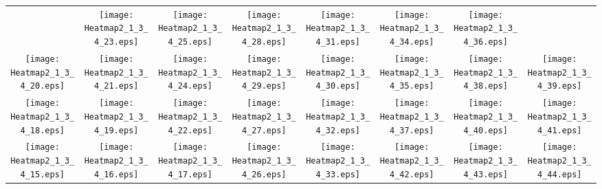 \documentclass{standalone}
\begin{document}
\renewcommand{\arraystretch}{0}
\setlength{\tabcolsep}{0pt}
\begin{tabular}{ *8{c} }
 & \texttt{[image: Heatmap2\_1\_3\_4\_23.eps]} & \texttt{[image: Heatmap2\_1\_3\_4\_25.eps]} & \texttt{[image: Heatmap2\_1\_3\_4\_28.eps]} & \texttt{[image: Heatmap2\_1\_3\_4\_31.eps]} & \texttt{[image: Heatmap2\_1\_3\_4\_34.eps]} & \texttt{[image: Heatmap2\_1\_3\_4\_36.eps]} &  \\
\texttt{[image: Heatmap2\_1\_3\_4\_20.eps]} & \texttt{[image: Heatmap2\_1\_3\_4\_21.eps]} & \texttt{[image: Heatmap2\_1\_3\_4\_24.eps]} & \texttt{[image: Heatmap2\_1\_3\_4\_29.eps]} & \texttt{[image: Heatmap2\_1\_3\_4\_30.eps]} & \texttt{[image: Heatmap2\_1\_3\_4\_35.eps]} & \texttt{[image: Heatmap2\_1\_3\_4\_38.eps]} & \texttt{[image: Heatmap2\_1\_3\_4\_39.eps]} \\
\texttt{[image: Heatmap2\_1\_3\_4\_18.eps]} & \texttt{[image: Heatmap2\_1\_3\_4\_19.eps]} & \texttt{[image: Heatmap2\_1\_3\_4\_22.eps]} & \texttt{[image: Heatmap2\_1\_3\_4\_27.eps]} & \texttt{[image: Heatmap2\_1\_3\_4\_32.eps]} & \texttt{[image: Heatmap2\_1\_3\_4\_37.eps]} & \texttt{[image: Heatmap2\_1\_3\_4\_40.eps]} & \texttt{[image: Heatmap2\_1\_3\_4\_41.eps]} \\
\texttt{[image: Heatmap2\_1\_3\_4\_15.eps]} & \texttt{[image: Heatmap2\_1\_3\_4\_16.eps]} & \texttt{[image: Heatmap2\_1\_3\_4\_17.eps]} & \texttt{[image: Heatmap2\_1\_3\_4\_26.eps]} & \texttt{[image: Heatmap2\_1\_3\_4\_33.eps]} & \texttt{[image: Heatmap2\_1\_3\_4\_42.eps]} & \texttt{[image: Heatmap2\_1\_3\_4\_43.eps]} & \texttt{[image: Heatmap2\_1\_3\_4\_44.eps]} \\

\end{tabular}
\end{document}
